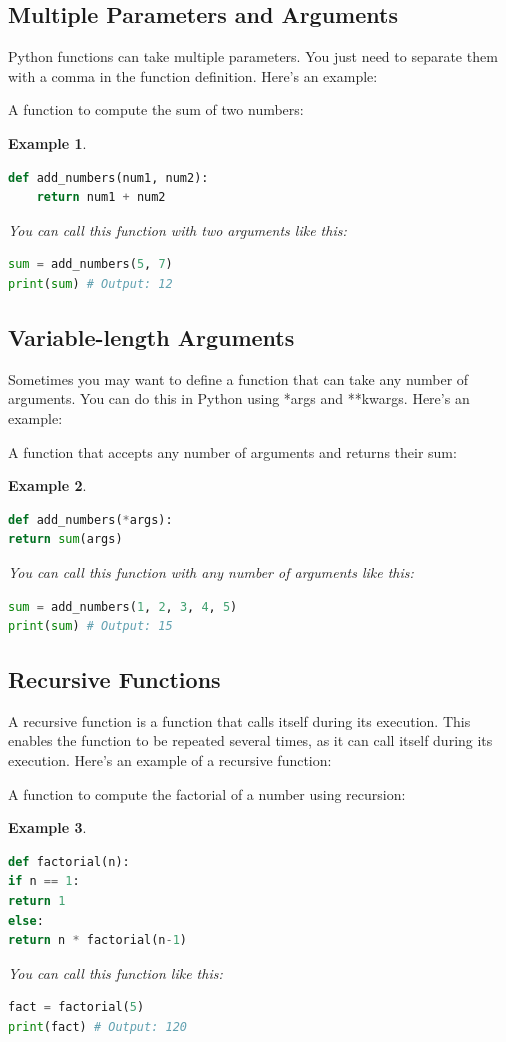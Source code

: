 \documentclass[12pt]{article}
\newtheorem{Example}{Example}[section]
\begin{document}
\subsection{Multiple Parameters and Arguments}
Python functions can take multiple parameters. You just need to separate them with a comma in the function definition. Here's an example:


A function to compute the sum of two numbers:
\begin{Example}
\begin{lstlisting}[language=Python]
def add_numbers(num1, num2):
	return num1 + num2
\end{lstlisting}
You can call this function with two arguments like this:
\begin{lstlisting}[language=Python]
sum = add_numbers(5, 7)
print(sum) # Output: 12
\end{lstlisting}
\end{Example}

\subsection{Variable-length Arguments}
Sometimes you may want to define a function that can take any number of arguments. You can do this in Python using *args and **kwargs. Here's an example:


A function that accepts any number of arguments and returns their sum:
\begin{Example}
\begin{lstlisting}[language=Python]
def add_numbers(*args):
return sum(args)
\end{lstlisting}
You can call this function with any number of arguments like this:
\begin{lstlisting}[language=Python]
sum = add_numbers(1, 2, 3, 4, 5)
print(sum) # Output: 15
\end{lstlisting}
\end{Example}

\subsection{Recursive Functions}
A recursive function is a function that calls itself during its execution. This enables the function to be repeated several times, as it can call itself during its execution. Here's an example of a recursive function:


A function to compute the factorial of a number using recursion:
\begin{Example}
\begin{lstlisting}[language=Python]
def factorial(n):
if n == 1:
return 1
else:
return n * factorial(n-1)
\end{lstlisting}
You can call this function like this:
\begin{lstlisting}[language=Python]
fact = factorial(5)
print(fact) # Output: 120
\end{lstlisting}
\end{Example}
\end{document}
